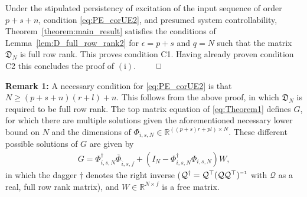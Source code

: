 Under the stipulated persistency of excitation of the input sequence of order $p+s+n$, condition \eqref{eq:PE_corUE2}, and presumed system controllability, Theorem~\ref{theorem:main_result} satisfies the conditions of Lemma~\ref{lem:D_full_row_rank2} for $\epsilon=p+s$ and $q=N$ such that the matrix $\mathfrak{D}_N$ is full row rank. This proves condition C1. Having already proven condition C2 this concludes the proof of $\mathrm{(i)}$. $\hfill\qed$

\noindent\textbf{Remark 1:} A necessary condition for \eqref{eq:PE_corUE2} is that ${N\geq(p+s+n)(r+l)+n}$. This follows from the above proof, in which $\mathfrak{D}_N$ is required to be full row rank. The top matrix equation of \eqref{eq:Theorem1} defines $G$, for which there are multiple solutions given the aforementioned necessary lower bound on $N$ and the dimensions of $\Phi_{i,s,N}\in\mathbb{R}^{((p+s)r+pl)\times N}$. These different possible solutions of $G$ are given by
\begin{align}\label{eq:G_sols}
    G = \Phi_{i,s,N}^\dagger\overline{\Phi}_{\hat{i},s,f} + (I_N-\Phi_{i,s,N}^\dagger\Phi_{i,s,N})W,
\end{align}
in which the dagger $\dagger$ denotes the right inverse ($\mathcal{Q}^\dagger=\mathcal{Q}^\top(\mathcal{Q}\mathcal{Q}^\top)\inv$ with $\mathcal{Q}$ as a real, full row rank matrix), and $W\in\mathbb{R}^{N\times f}$ is a free matrix.

